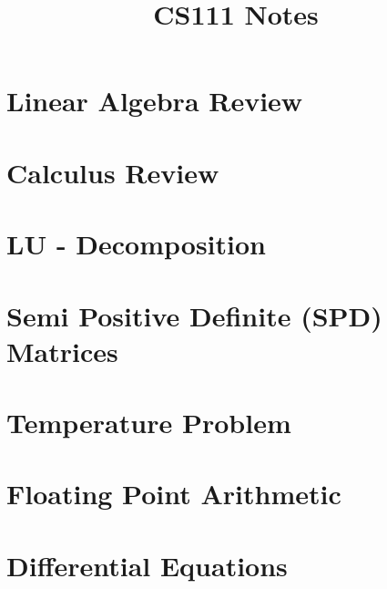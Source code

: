 \documentclass[12pt]{article}
\title{CS111  Notes}
\date{}
\begin{document}
    \maketitle
    \tableofcontents
    \newpage
    
    \section{Linear Algebra Review}
    
    
    
    
    

   \section{Calculus Review}
   \section{LU - Decomposition}
   \section{Semi Positive Definite (SPD) Matrices}
   \section{Temperature Problem}
   \section{Floating Point Arithmetic}
   \section{Differential Equations}
   \section{}
\end{document}
